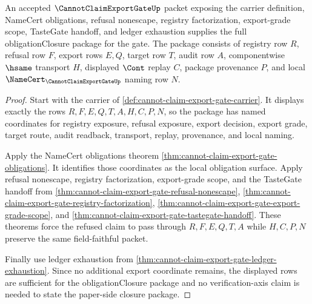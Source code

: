 \begin{theorem}
\label{thm:cannot-claim-export-gate-obligation-closure-package}
An accepted $\CannotClaimExportGateUp$ packet exposing the carrier definition, NameCert obligations, refusal nonescape, registry factorization, export-grade scope, TasteGate handoff, and ledger exhaustion supplies the full obligationClosure package for the gate. The package consists of registry row $R$, refusal row $F$, export rows $E,Q$, target row $T$, audit row $A$, componentwise $\hsame$ transport $H$, displayed $\Cont$ replay $C$, package provenance $P$, and local $\NameCert_{\CannotClaimExportGateUp}$ naming row $N$.
\end{theorem}
\begin{proof}
Start with the carrier of \autoref{def:cannot-claim-export-gate-carrier}. It displays exactly the rows $R,F,E,Q,T,A,H,C,P,N$, so the package has named coordinates for registry exposure, refusal exposure, export decision, export grade, target route, audit readback, transport, replay, provenance, and local naming.

Apply the NameCert obligations theorem \autoref{thm:cannot-claim-export-gate-obligations}. It identifies those coordinates as the local obligation surface. Apply refusal nonescape, registry factorization, export-grade scope, and the TasteGate handoff from \autoref{thm:cannot-claim-export-gate-refusal-nonescape}, \autoref{thm:cannot-claim-export-gate-registry-factorization}, \autoref{thm:cannot-claim-export-gate-export-grade-scope}, and \autoref{thm:cannot-claim-export-gate-tastegate-handoff}. These theorems force the refused claim to pass through $R,F,E,Q,T,A$ while $H,C,P,N$ preserve the same field-faithful packet.

Finally use ledger exhaustion from \autoref{thm:cannot-claim-export-gate-ledger-exhaustion}. Since no additional export coordinate remains, the displayed rows are sufficient for the obligationClosure package and no verification-axis claim is needed to state the paper-side closure package.
\end{proof}

